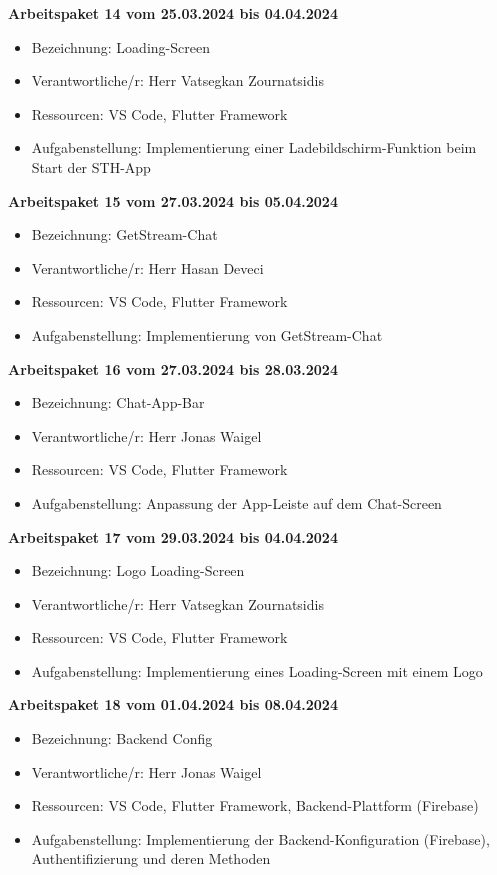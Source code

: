 \textbf{Arbeitspaket 14 vom 25.03.2024 bis 04.04.2024}
\begin{itemize}[itemsep=0pt]
    \item{Bezeichnung: Loading-Screen} 
	\item{Verantwortliche/r: Herr Vatsegkan Zournatsidis} 
	\item{Ressourcen: VS Code, Flutter Framework} 
    \item{Aufgabenstellung: Implementierung einer Ladebildschirm-Funktion beim Start der STH-App}
\end{itemize}

\textbf{Arbeitspaket 15 vom 27.03.2024 bis 05.04.2024}
\begin{itemize}[itemsep=0pt]
    \item{Bezeichnung: GetStream-Chat} 
	\item{Verantwortliche/r: Herr Hasan Deveci} 
	\item{Ressourcen: VS Code, Flutter Framework} 
    \item{Aufgabenstellung: Implementierung von GetStream-Chat}
\end{itemize}

\textbf{Arbeitspaket 16 vom 27.03.2024 bis 28.03.2024}
\begin{itemize}[itemsep=0pt]
    \item{Bezeichnung: Chat-App-Bar}
	\item{Verantwortliche/r: Herr Jonas Waigel} 
	\item{Ressourcen: VS Code, Flutter Framework} 
    \item{Aufgabenstellung: Anpassung der App-Leiste auf dem Chat-Screen}
\end{itemize} 

\textbf{Arbeitspaket 17 vom 29.03.2024 bis 04.04.2024}
\begin{itemize}[itemsep=0pt]
    \item{Bezeichnung: Logo Loading-Screen} 
	\item{Verantwortliche/r: Herr Vatsegkan Zournatsidis} 
	\item{Ressourcen: VS Code, Flutter Framework} 
    \item{Aufgabenstellung: Implementierung eines Loading-Screen mit einem Logo}
\end{itemize}

\textbf{Arbeitspaket 18 vom 01.04.2024 bis 08.04.2024}
\begin{itemize}[itemsep=0pt]
    \item{Bezeichnung: Backend Config} 
	\item{Verantwortliche/r: Herr Jonas Waigel} 
	\item{Ressourcen: VS Code, Flutter Framework, Backend-Plattform (Firebase)}
    \item{Aufgabenstellung: Implementierung der Backend-Konfiguration (Firebase), Authentifizierung und deren Methoden} 
\end{itemize}

